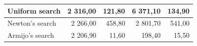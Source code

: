 \documentclass[english, 12pt, a4paper, sci, utf8, a-1b, online, table]{aaltothesis}
\begin{document}
\begin{table}[H]
\begin{tabular}{|l|r|r|r|r|}
    Uniform search                                                             & \cellcolor[HTML]{FDF0EF}2 316,00                         & \cellcolor[HTML]{FDF0EF}121,80                            & \cellcolor[HTML]{E67B73}6 371,10                          & \cellcolor[HTML]{FDF0EF}134,90                            \\ \hline
    Newton's search                                                             & 2 266,00                                                 & \cellcolor[HTML]{E67B73}458,80                            & \cellcolor[HTML]{F6CFCB}2 801,70                          & \cellcolor[HTML]{E67B73}541,00                            \\ \hline
    Armijo's search                                                              & \cellcolor[HTML]{E5F4ED}2 206,90                         & \cellcolor[HTML]{57BB89}11,60                             & \cellcolor[HTML]{57BB89}198,40                            & \cellcolor[HTML]{57BB89}15,50                             \\ \hline
    \end{tabular}
\end{table}
\end{document}
